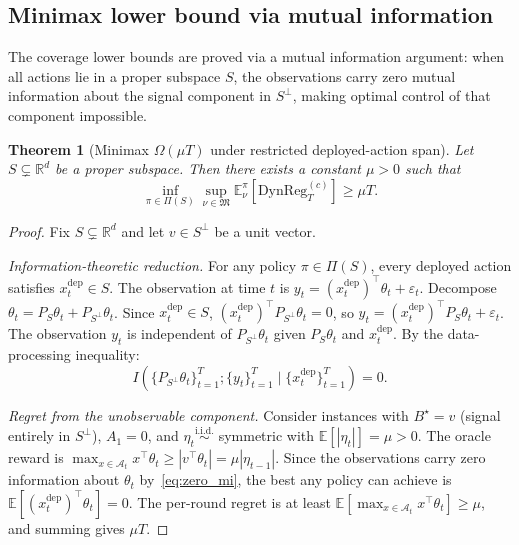 \documentclass[12pt]{article}
\newcommand{\R}{\mathbb{R}}
\newcommand{\E}{\mathbb{E}}
\newcommand{\cA}{\mathcal{A}}
\newcommand{\DynReg}{\mathrm{DynReg}}
\newtheorem{theorem}{Theorem}
\theoremstyle{plain}
\theoremstyle{definition}
\begin{document}
\subsection{Minimax lower bound via mutual information}

The coverage lower bounds are proved via a mutual information argument: when all actions lie in a proper subspace $S$, the observations carry zero mutual information about the signal component in $S^\perp$, making optimal control of that component impossible.

\begin{theorem}[Minimax $\Omega(\mu T)$ under restricted deployed-action span]
\label{thm:coverage_lb}
Let $S \subsetneq \R^d$ be a proper subspace. Then there exists a constant $\mu > 0$ such that
\begin{equation}
\inf_{\pi \in \Pi(S)} \sup_{\nu \in \mathfrak{M}}
\E_\nu^\pi[\DynReg_T^{(c)}] \ge \mu T.
\label{eq:coverage_lb}
\end{equation}
\end{theorem}

\begin{proof}
Fix $S \subsetneq \R^d$ and let $v \in S^\perp$ be a unit vector.

\emph{Information-theoretic reduction.}
For any policy $\pi \in \Pi(S)$, every deployed action satisfies $x_t^{\mathrm{dep}} \in S$. The observation at time $t$ is $y_t = (x_t^{\mathrm{dep}})^\top \theta_t + \varepsilon_t$. Decompose $\theta_t = P_S \theta_t + P_{S^\perp}\theta_t$. Since $x_t^{\mathrm{dep}} \in S$, $(x_t^{\mathrm{dep}})^\top P_{S^\perp}\theta_t = 0$, so $y_t = (x_t^{\mathrm{dep}})^\top P_S \theta_t + \varepsilon_t$. The observation $y_t$ is independent of $P_{S^\perp}\theta_t$ given $P_S\theta_t$ and $x_t^{\mathrm{dep}}$. By the data-processing inequality:
\begin{equation}
I(\{P_{S^\perp}\theta_t\}_{t=1}^T ; \{y_t\}_{t=1}^T \mid \{x_t^{\mathrm{dep}}\}_{t=1}^T) = 0.
\label{eq:zero_mi}
\end{equation}

\emph{Regret from the unobservable component.}
Consider instances with $B^\star = v$ (signal entirely in $S^\perp$), $A_1 = 0$, and $\eta_t \stackrel{\mathrm{i.i.d.}}{\sim}$ symmetric with $\E[|\eta_t|] = \mu > 0$. The oracle reward is $\max_{x \in \cA_t} x^\top \theta_t \ge |v^\top\theta_t| = \mu|\eta_{t-1}|$. Since the observations carry zero information about $\theta_t$ by~\eqref{eq:zero_mi}, the best any policy can achieve is $\E[(x_t^{\mathrm{dep}})^\top\theta_t] = 0$. The per-round regret is at least $\E[\max_{x \in \cA_t} x^\top\theta_t] \ge \mu$, and summing gives $\mu T$.
\end{proof}
\end{document}
